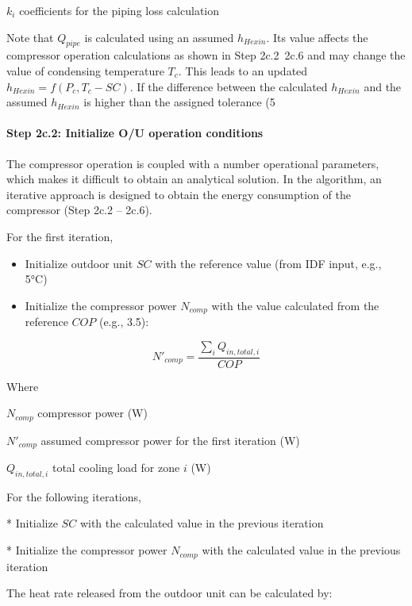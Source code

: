 $k_i$	coefficients for the piping loss calculation  

Note that $Q_{pipe}$ is calculated using an assumed $h_{Hexin}$. Its value affects the compressor operation calculations as shown in Step 2c.2~2c.6 and may change the value of condensing temperature $T_c$. This leads to an updated $h_{Hexin}=f(P_c,T_c-SC)$. If the difference between the calculated $h_{Hexin}$ and the assumed $h_{Hexin}$ is higher than the assigned tolerance (5%

\paragraph{Step 2c.2: Initialize O/U operation conditions}\label{step-2c.2-initialize-ou-operation-conditions}

The compressor operation is coupled with a number operational parameters, which makes it difficult to obtain an analytical solution. In the algorithm, an iterative approach is designed to obtain the energy consumption of the compressor (Step 2c.2 – 2c.6).

For the first iteration, 

\begin{itemize}
  \item
    Initialize outdoor unit $SC$ with the reference value (from IDF input, e.g., 5°C)
  \item
    Initialize the compressor power $N_{comp}$ with the value calculated from the reference $COP$ (e.g., 3.5):
\end{itemize}

\begin{equation}N'_{comp}=\frac{\sum_iQ_{in,total,i}}{COP}\end{equation}

Where

$N_{comp}$	compressor power (W)

$N'_{comp}$	assumed compressor power for the first iteration (W)

$Q_{in,total,i}$	total cooling load for zone $i$ (W)

For the following iterations,

* Initialize $SC$ with the calculated value in the previous iteration  

* Initialize the compressor power $N_{comp}$ with the calculated value in the previous iteration

The heat rate released from the outdoor unit can be calculated by:


